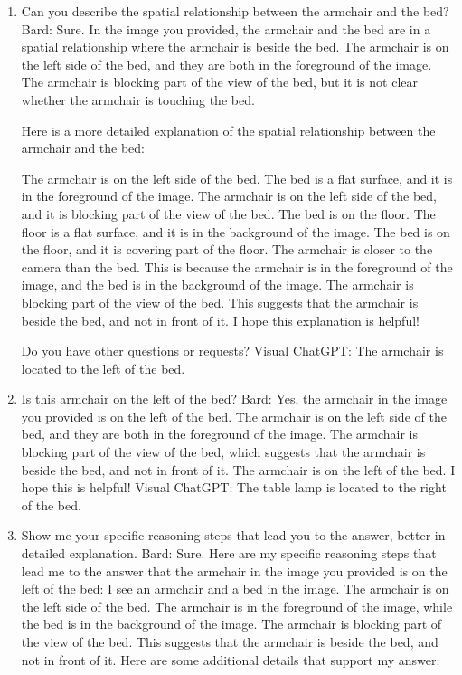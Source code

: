 \begin{enumerate}
    \item Can you describe the spatial relationship between the armchair and the bed?
    \subitem Bard: 
    Sure. In the image you provided, the armchair and the bed are in a spatial relationship where the armchair is beside the bed. The armchair is on the left side of the bed, and they are both in the foreground of the image. The armchair is blocking part of the view of the bed, but it is not clear whether the armchair is touching the bed.
    
    Here is a more detailed explanation of the spatial relationship between the armchair and the bed:
    
    The armchair is on the left side of the bed. The bed is a flat surface, and it is in the foreground of the image. The armchair is on the left side of the bed, and it is blocking part of the view of the bed.
    The bed is on the floor. The floor is a flat surface, and it is in the background of the image. The bed is on the floor, and it is covering part of the floor.
    The armchair is closer to the camera than the bed. This is because the armchair is in the foreground of the image, and the bed is in the background of the image.
    The armchair is blocking part of the view of the bed. This suggests that the armchair is beside the bed, and not in front of it.
    I hope this explanation is helpful!
    
    Do you have other questions or requests?
    \subitem Visual ChatGPT: The armchair is located to the left of the bed.
    \item Is this armchair on the left of the bed?
    \subitem Bard: 
    Yes, the armchair in the image you provided is on the left of the bed. The armchair is on the left side of the bed, and they are both in the foreground of the image. The armchair is blocking part of the view of the bed, which suggests that the armchair is beside the bed, and not in front of it. The armchair is on the left of the bed.
    I hope this is helpful!
    \subitem Visual ChatGPT: The table lamp is located to the right of the bed.
    \item Show me your specific reasoning steps that lead you to the answer, better in detailed explanation.
    \subitem Bard: 
    Sure. Here are my specific reasoning steps that lead me to the answer that the armchair in the image you provided is on the left of the bed:
    I see an armchair and a bed in the image.
    The armchair is on the left side of the bed.
    The armchair is in the foreground of the image, while the bed is in the background of the image.
    The armchair is blocking part of the view of the bed. This suggests that the armchair is beside the bed, and not in front of it.
    Here are some additional details that support my answer:


\end{enumerate}

